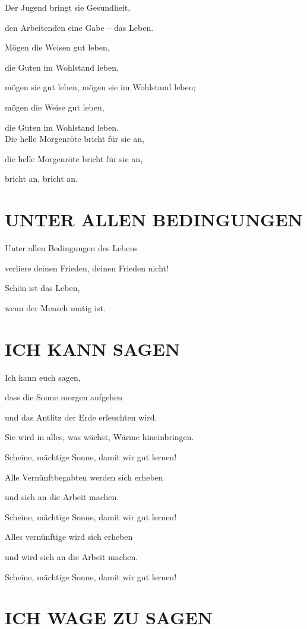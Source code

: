 \documentclass[11pt,a5paper,twoside]{article}
\begin{document}
Der Jugend bringt sie Gesundheit, 

den Arbeitenden eine Gabe -- das Leben. 

Mögen die Weisen gut leben, 

die Guten im Wohlstand leben,

mögen sie gut leben, mögen sie im Wohlstand leben;

mögen die Weise gut leben,

die Guten im Wohlstand leben.\\ 

Die helle Morgenröte bricht für sie an,

die helle Morgenröte bricht für sie an, 

bricht an, bricht an.

\section[Unter allen Bedingungen]{UNTER ALLEN BEDINGUNGEN}


Unter allen Bedingungen des Lebens 

verliere deinen Frieden, deinen Frieden nicht!

Schön ist das Leben, 

wenn der Mensch mutig ist.

\section[Ich kann sagen]{ICH KANN SAGEN}

Ich kann euch sagen, 

dass die Sonne morgen aufgehen 

und das Antlitz der Erde erleuchten wird.

Sie wird in alles, was wächst, Wärme hineinbringen. 

Scheine, mächtige Sonne, damit wir gut lernen!

Alle Vernünftbegabten werden sich erheben

und sich an die Arbeit machen. 

Scheine, mächtige Sonne, damit wir gut lernen!

Alles vernünftige wird sich erheben

und wird sich an die Arbeit machen.

Scheine, mächtige Sonne, damit wir gut lernen! 



\section[Ich wage zu sagen]{ICH WAGE ZU SAGEN}
\end{document}
